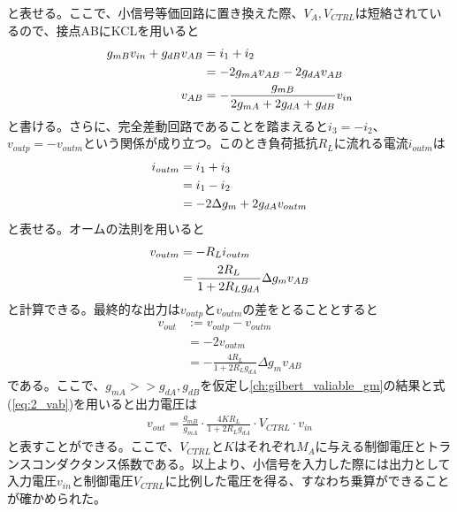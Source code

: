             と表せる。ここで、小信号等価回路に置き換えた際、$V_{A},V_{CTRL}$は短絡されているので、接点ABにKCLを用いると
            \begin{align}
                g_{mB}v_{in}+g_{dB}v_{AB}&=i_{1}+i_{2}    \notag\\
                &=-2g_{mA}v_{AB}-2g_{dA}v_{AB}               \notag\\
                v_{AB}&=-\frac{g_{mB}}{2g_{mA}+2g_{dA}+g_{dB}}v_{in}     \label{eq:2_vab}
            \end{align}
            と書ける。さらに、完全差動回路であることを踏まえると$i_{3}=-i_{2}$、$v_{outp}=-v_{outm}$という関係が成り立つ。このとき負荷抵抗$R_{L}$に流れる電流$i_{outm}$は
            \begin{align}
                i_{outm}&=i_{1}+i_{3}       \notag\\
                &=i_{1}-i_{2}   \notag\\
                &=-2\Delta g_{m}+2g_{dA}v_{outm}    \label{eq:2_ioutm}
            \end{align}
            と表せる。オームの法則を用いると
            \begin{align}
                v_{outm}&=-R_{L}i_{outm}    \notag\\
                &=\frac{ 2R_{L} }{1+2R_{L}g_{dA}}\Delta g_{m}v_{AB}     \notag
            \end{align}
            と計算できる。最終的な出力は$v_{outp}$と$v_{outm}$の差をとることとすると
            \begin{align*}
                v_{out}&:=v_{outp}-v_{outm}     \\
                &=-2v_{outm}                    \\
                &=-\frac{ 4R_{L} }{1+2R_{L}g_{dA}}\Delta g_{m}v_{AB}
            \end{align*}
            である。ここで、$g_{mA}>>g_{dA},g_{dB}$を仮定し\ref{ch:gilbert_valiable_gm}の結果と式(\ref{eq:2_vab})を用いると出力電圧は
            \begin{align}
                v_{out}=\frac{ g_{mB} }{ g_{mA} }\cdot \frac{ 4KR_{L} }{ 1+2R_{L}g_{dA} }\cdot V_{CTRL}\cdot v_{in}       \label{eq:2_vout}
            \end{align}
            と表すことができる。ここで、$V_{CTRL}$と$K$はそれぞれ$M_{A}$に与える制御電圧とトランスコンダクタンス係数である。以上より、小信号を入力した際には出力として入力電圧$v_{in}$と制御電圧$V_{CTRL}$に比例した電圧を得る、すなわち乗算ができることが確かめられた。
            \newpage


